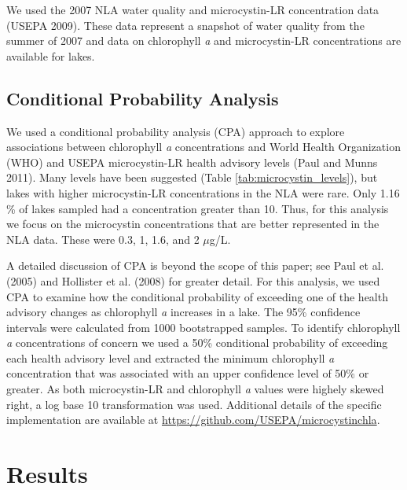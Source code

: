 \documentclass[11pt,]{article}
\begin{document}
We used the 2007 NLA water quality and microcystin-LR concentration data
(USEPA 2009). These data represent a snapshot of water quality from the
summer of 2007 and data on chlorophyll \emph{a} and microcystin-LR
concentrations are available for lakes.

\subsection{Conditional Probability
Analysis}\label{conditional-probability-analysis}

We used a conditional probability analysis (CPA) approach to explore
associations between chlorophyll \emph{a} concentrations and World
Health Organization (WHO) and USEPA microcystin-LR health advisory
levels (Paul and Munns 2011). Many levels have been suggested (Table
\ref{tab:microcystin_levels}), but lakes with higher microcystin-LR
concentrations in the NLA were rare. Only 1.16 \% of lakes sampled had a
concentration greater than 10. Thus, for this analysis we focus on the
microcystin concentrations that are better represented in the NLA data.
These were 0.3, 1, 1.6, and 2 \(\mu\)g/L.

A detailed discussion of CPA is beyond the scope of this paper; see Paul
et al. (2005) and Hollister et al. (2008) for greater detail. For this
analysis, we used CPA to examine how the conditional probability of
exceeding one of the health advisory changes as chlorophyll \emph{a}
increases in a lake. The 95\% confidence intervals were calculated from
1000 bootstrapped samples. To identify chlorophyll \emph{a}
concentrations of concern we used a 50\% conditional probability of
exceeding each health advisory level and extracted the minimum
chlorophyll \emph{a} concentration that was associated with an upper
confidence level of 50\% or greater. As both microcystin-LR and
chlorophyll \emph{a} values were highely skewed right, a log base 10
transformation was used. Additional details of the specific
implementation are available at
\url{https://github.com/USEPA/microcystinchla}.

\section{Results}\label{results}
\end{document}
